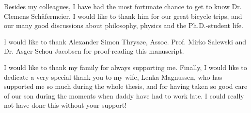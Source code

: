 Besides my colleagues, I have had the most fortunate chance to get to know Dr. Clemens Sch{\"a}fermeier.
I would like to thank him for our great bicycle trips, and our many good discussions about philosophy, physics and the Ph.D.-student life.

I would like to thank Alexander Simon Thrys{\o}e, Assoc. Prof. Mirko Salewski and Dr.  Asger Schou Jacobsen for proof-reading this manuscript.

I would like to thank my family for always supporting me.
Finally, I would like to dedicate a very special thank you to my wife, Lenka Magnussen, who has supported me so much during the whole thesis, and for having taken so good care of our son during the moments when daddy have had to work late.
I could really not have done this without your support!
